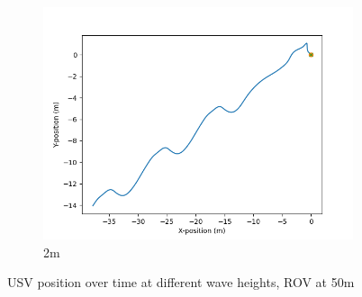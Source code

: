 \documentclass[class=article, crop=false]{standalone}
\begin{document}
\begin{figure}
\begin{subfigure}[b]{0.48\textwidth}
        \includegraphics{scenario1/rov-50m/2.0m/usv_position_uncontrolled}
        \caption{2m}
        \label{}
    \end{subfigure}

    \caption{USV position over time at different wave heights, ROV at 50m}
\end{figure}
\end{document}
